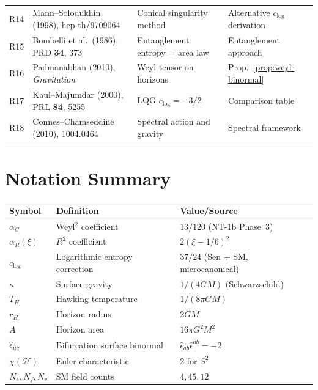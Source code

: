 \documentclass[12pt,a4paper]{article}
\theoremstyle{definition}
\theoremstyle{remark}
\begin{document}
\begin{center}
\begin{longtable}{p{1.2cm}p{5.2cm}p{3.5cm}p{4cm}}
R14 & Mann--Solodukhin (1998), hep-th/9709064
  & Conical singularity method
  & Alternative $c_{\log}$ derivation \\
R15 & Bombelli et al.\ (1986), PRD \textbf{34}, 373
  & Entanglement entropy = area law
  & Entanglement approach \\
R16 & Padmanabhan (2010), \textit{Gravitation}
  & Weyl tensor on horizons
  & Prop.~\ref{prop:weyl-binormal} \\
R17 & Kaul--Majumdar (2000), PRL \textbf{84}, 5255
  & LQG $c_{\log} = -3/2$
  & Comparison table \\
R18 & Connes--Chamseddine (2010), 1004.0464
  & Spectral action and gravity
  & Spectral framework \\
\bottomrule
\end{longtable}
\end{center}


\section{Notation Summary}
\label{sec:notation}

\begin{center}
\begin{tabular}{lll}
\toprule
Symbol & Definition & Value/Source \\
\midrule
$\alpha_C$ & Weyl${}^2$ coefficient & $13/120$ (NT-1b Phase~3) \\
$\alpha_R(\xi)$ & $R^2$ coefficient & $2(\xi - 1/6)^2$ \\
$c_{\log}$ & Logarithmic entropy correction & $37/24$ (Sen + SM, microcanonical) \\
$\kappa$ & Surface gravity & $1/(4GM)$ (Schwarzschild) \\
$T_H$ & Hawking temperature & $1/(8\pi GM)$ \\
$r_H$ & Horizon radius & $2GM$ \\
$A$ & Horizon area & $16\pi G^2 M^2$ \\
$\hat{\epsilon}_{\mu\nu}$ & Bifurcation surface binormal &
  $\hat{\epsilon}_{ab}\hat{\epsilon}^{ab} = -2$ \\
$\chi(\mathcal{H})$ & Euler characteristic & $2$ for $S^2$ \\
$N_s, N_f, N_v$ & SM field counts & $4, 45, 12$ \\
\bottomrule
\end{tabular}
\end{center}
\end{document}
